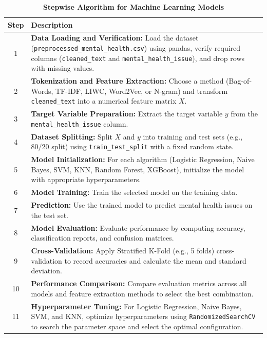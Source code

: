 \begin{table}[H]
    \caption*{\textbf{Stepwise Algorithm for Machine Learning Models}}
    \label{tab:stepwise_algorithm}
    \centering
    \renewcommand{\arraystretch}{1.2}
    \small
    \begin{tabularx}{\textwidth}{|c|X|}
        \hline
        \textbf{Step} & \textbf{Description} \\
        \hline
        1 & \textbf{Data Loading and Verification:} Load the dataset (\texttt{preprocessed\_mental\_health.csv}) using pandas, verify required columns (\texttt{cleaned\_text} and \texttt{mental\_health\_issue}), and drop rows with missing values. \\
        \hline
        2 & \textbf{Tokenization and Feature Extraction:} Choose a method (Bag-of-Words, TF-IDF, LIWC, Word2Vec, or N-gram) and transform \texttt{cleaned\_text} into a numerical feature matrix $X$. \\
        \hline
        3 & \textbf{Target Variable Preparation:} Extract the target variable $y$ from the \texttt{mental\_health\_issue} column. \\
        \hline
        4 & \textbf{Dataset Splitting:} Split $X$ and $y$ into training and test sets (e.g., 80/20 split) using \texttt{train\_test\_split} with a fixed random state. \\
        \hline
        5 & \textbf{Model Initialization:} For each algorithm (Logistic Regression, Naive Bayes, SVM, KNN, Random Forest, XGBoost), initialize the model with appropriate hyperparameters. \\
        \hline
        6 & \textbf{Model Training:} Train the selected model on the training data. \\
        \hline
        7 & \textbf{Prediction:} Use the trained model to predict mental health issues on the test set. \\
        \hline
        8 & \textbf{Model Evaluation:} Evaluate performance by computing accuracy, classification reports, and confusion matrices. \\
        \hline
        9 & \textbf{Cross-Validation:} Apply Stratified K-Fold (e.g., 5 folds) cross-validation to record accuracies and calculate the mean and standard deviation. \\
        \hline
        10 & \textbf{Performance Comparison:} Compare evaluation metrics across all models and feature extraction methods to select the best combination. \\
        \hline
        11 & \textbf{Hyperparameter Tuning:} For Logistic Regression, Naive Bayes, SVM, and KNN, optimize hyperparameters using \texttt{RandomizedSearchCV} to search the parameter space and select the optimal configuration. \\
        \hline
    \end{tabularx}
\end{table}



